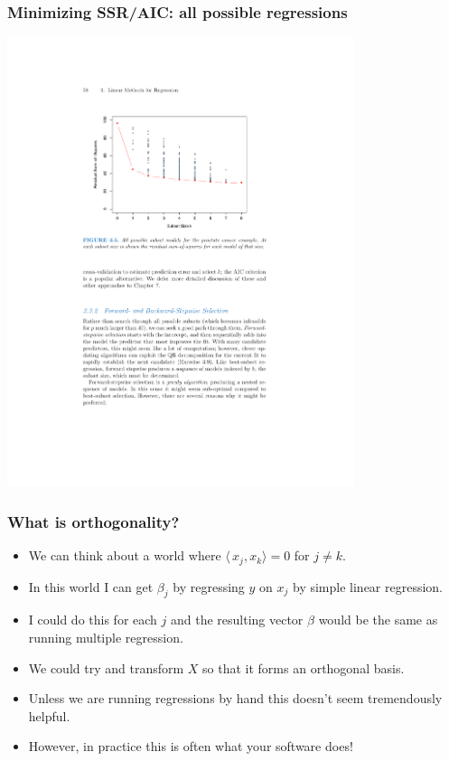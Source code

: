 \documentclass[xcolor=pdftex,dvipsnames,table,mathserif]{beamer}
\begin{document}
\begin{frame}
\frametitle{Minimizing SSR/AIC: all possible regressions}
\begin{center}
\includegraphics[width=4in]{./resources/subsetsaic}
\end{center}
\end{frame}

\begin{frame}
\frametitle{What is orthogonality?}
\begin{itemize}
\item We can think about a world where $\langle\, x_j, x_k \rangle =0$ for $j \neq k$.
\item In this world I can get $\beta_j$ by regressing $y$ on $x_j$ by simple linear regression.
\item I could do this for each $j$ and the resulting vector $\beta$ would be the same as running multiple regression.
\item We could try and transform $X$ so that it forms an \alert{orthogonal basis}.
\item Unless we are running regressions by hand this doesn't seem tremendously helpful.
\item However, in practice this is often what your software does!
\end{itemize}
\end{frame}
\end{document}
